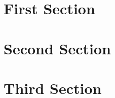\documentclass[10pt]{article}
\begin{document}
\section{First Section}
\lipsum[1-4]

\newpage
\section{Second Section}
\begin{multicols*}{2}
\lipsum[1-4]

\lipsum[1-4]
\end{multicols*}

\section{Third Section}
\lipsum[1-4]
\end{document}
